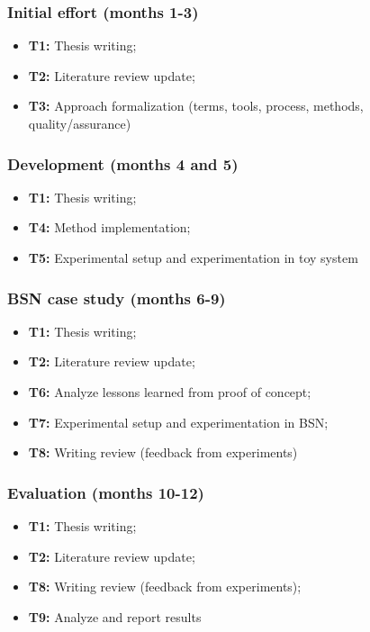 
\subsubsection{Initial effort (months 1-3)}
\begin{itemize}
\item \textbf{T1:} Thesis writing;
\item \textbf{T2:} Literature review update;
\item \textbf{T3:} Approach formalization (terms, tools, process, methods, quality/assurance)
\end{itemize}

\subsubsection{Development (months 4 and 5)}
\begin{itemize}
	\item \textbf{T1:} Thesis writing;
	\item \textbf{T4:} Method implementation;
	\item \textbf{T5:} Experimental setup and experimentation in toy system
\end{itemize}

\subsubsection{BSN case study (months 6-9)}
\begin{itemize}
	\item \textbf{T1:} Thesis writing;
	\item \textbf{T2:} Literature review update;
	\item \textbf{T6:} Analyze lessons learned from proof of concept;
	\item \textbf{T7:} Experimental setup and experimentation in BSN;
	\item \textbf{T8:} Writing review (feedback from experiments)
\end{itemize}

\subsubsection{Evaluation (months 10-12)}
\begin{itemize}
	\item \textbf{T1:} Thesis writing;
	\item \textbf{T2:} Literature review update;
	\item \textbf{T8:} Writing review (feedback from experiments);
	\item \textbf{T9:} Analyze and report results
\end{itemize}

